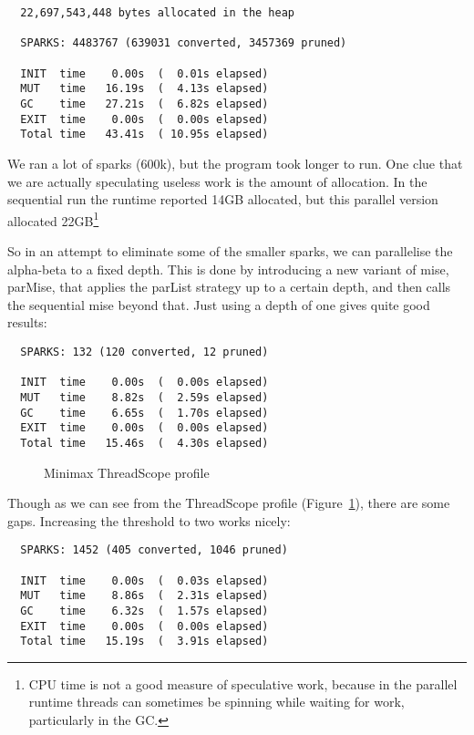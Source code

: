 \documentclass[twocolumn,9pt]{sigplanconf}
\newcommand{\codef}[1]{{\fontfamily{cmss}\small#1}}
\begin{document}
\begin{verbatim}
  22,697,543,448 bytes allocated in the heap

  SPARKS: 4483767 (639031 converted, 3457369 pruned)

  INIT  time    0.00s  (  0.01s elapsed)
  MUT   time   16.19s  (  4.13s elapsed)
  GC    time   27.21s  (  6.82s elapsed)
  EXIT  time    0.00s  (  0.00s elapsed)
  Total time   43.41s  ( 10.95s elapsed)
\end{verbatim}

We ran a lot of sparks (600k), but the program took longer to run.
One clue that we are actually speculating useless work is the amount
of allocation.  In the sequential run the runtime reported 14GB
allocated, but this parallel version allocated 22GB\footnote{CPU time
  is not a good measure of speculative work, because in the parallel
  runtime threads can sometimes be spinning while waiting for work,
  particularly in the GC.}

So in an attempt to eliminate some of the smaller sparks, we can
parallelise the alpha-beta to a fixed depth.  This is done by
introducing a new variant of \codef{mise}, \codef{parMise}, that
applies the \codef{parList} strategy up to a certain depth, and then
calls the sequential \codef{mise} beyond that.  Just using a depth of
one gives quite good results:

\begin{verbatim}
  SPARKS: 132 (120 converted, 12 pruned)

  INIT  time    0.00s  (  0.00s elapsed)
  MUT   time    8.82s  (  2.59s elapsed)
  GC    time    6.65s  (  1.70s elapsed)
  EXIT  time    0.00s  (  0.00s elapsed)
  Total time   15.46s  (  4.30s elapsed)
\end{verbatim}

\begin{figure}
\caption{Minimax ThreadScope profile}
\label{f:minimax-threadscope2}
\end{figure}

Though as we can see from the ThreadScope profile
(Figure~\ref{f:minimax-threadscope2}), there are some gaps.
Increasing the threshold to two works nicely:

\begin{verbatim}
  SPARKS: 1452 (405 converted, 1046 pruned)

  INIT  time    0.00s  (  0.03s elapsed)
  MUT   time    8.86s  (  2.31s elapsed)
  GC    time    6.32s  (  1.57s elapsed)
  EXIT  time    0.00s  (  0.00s elapsed)
  Total time   15.19s  (  3.91s elapsed)
\end{verbatim}
\end{document}
